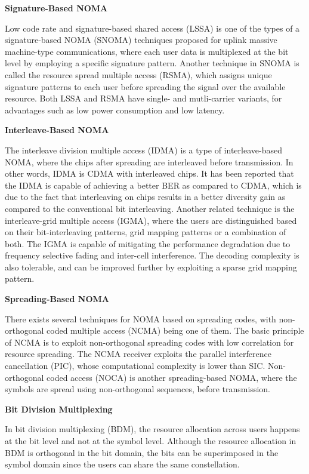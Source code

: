 \begin{multicols}{2}
\eject

\smallskip
\noindent
{\bf Signature-Based NOMA}


Low code rate and signature-based shared access (LSSA) is one of the types of a signature-based NOMA (SNOMA) techniques proposed for uplink massive machine-type communications, where each user data is multiplexed at the bit level by employing a specific signature pattern. Another technique in SNOMA is called the resource spread multiple access (RSMA), which assigns unique signature patterns to each user before spreading the signal over the available resource. Both LSSA and RSMA have single- and mutli-carrier variants, for advantages such as low power consumption and low latency.

\smallskip
\noindent
{\bf Interleave-Based NOMA}


The interleave division multiple access (IDMA) is a type of interleave-based NOMA, where the chips after spreading are interleaved before transmission. In other words, IDMA is CDMA with interleaved chips. It has been reported that the IDMA is capable of achieving a better BER as compared to CDMA, which is due to the fact that interleaving on chips results in a better diversity gain as compared to the conventional bit interleaving. Another related technique is the interleave-grid multiple access (IGMA), where the users are distinguished based on their bit-interleaving patterns, grid mapping patterns or a combination of both. The IGMA is capable of mitigating the performance degradation due to frequency selective fading and inter-cell interference. The decoding complexity is also tolerable, and can be improved further by exploiting a sparse grid mapping pattern.

\smallskip
\noindent
{\bf Spreading-Based NOMA}


There exists several techniques for NOMA based on spreading codes, with non-orthogonal coded multiple access (NCMA) being one of them. The basic principle of NCMA is to exploit non-orthogonal spreading codes with low correlation for resource spreading. The NCMA receiver exploits the parallel interference cancellation (PIC), whose computational complexity is lower than SIC. Non-orthogonal coded access (NOCA) is another spreading-based NOMA, where the symbols are spread using non-orthogonal sequences, before transmission.

\smallskip
\noindent
{\bf Bit Division Multiplexing}


In bit division multiplexing (BDM), the resource allocation across users happens at the bit level and not at the symbol level. Although the resource allocation in BDM is orthogonal in the bit domain, the bits can be superimposed in the symbol domain since the users can share the same constellation.


\end{multicols}
